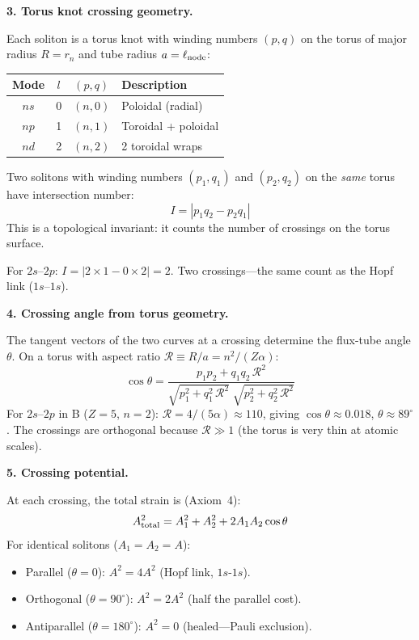 \noindent\textbf{3. Torus knot crossing geometry.}

Each soliton is a torus knot with winding
numbers $(p, q)$ on the torus of major radius
$R = r_n$ and tube radius $a = \ell_{\rm node}$:
\begin{center}
\small
\renewcommand{\arraystretch}{1.2}
\begin{tabular}{c c c l}
\toprule
\textbf{Mode} & $l$ & $(p, q)$ &
\textbf{Description} \\
\midrule
$ns$ & 0 & $(n, 0)$ & Poloidal (radial) \\
$np$ & 1 & $(n, 1)$ & Toroidal + poloidal \\
$nd$ & 2 & $(n, 2)$ & 2 toroidal wraps \\
\bottomrule
\end{tabular}
\end{center}

Two solitons with winding numbers
$(p_1, q_1)$ and $(p_2, q_2)$ on the \emph{same}
torus have intersection number:
\begin{equation}
    I = |p_1 q_2 - p_2 q_1|
    \label{eq:intersection_number}
\end{equation}
This is a topological invariant: it counts
the number of crossings on the torus surface.

For $2s$--$2p$:
$I = |2 \times 1 - 0 \times 2| = 2$.
Two crossings---the same count as the
Hopf link ($1s$--$1s$).

\noindent\textbf{4. Crossing angle from torus
geometry.}

The tangent vectors of the two curves at
a crossing determine the flux-tube angle
$\theta$.  On a torus with aspect ratio
$\mathcal{R} \equiv R/a = n^2/(Z\alpha)$:
\begin{equation}
    \cos\theta = \frac{p_1 p_2 + q_1 q_2\,
    \mathcal{R}^2}{\sqrt{p_1^2 + q_1^2\,
    \mathcal{R}^2}\;\sqrt{p_2^2 + q_2^2\,
    \mathcal{R}^2}}
    \label{eq:crossing_angle}
\end{equation}
For $2s$--$2p$ in B ($Z = 5$, $n = 2$):
$\mathcal{R} = 4/(5\alpha) \approx 110$,
giving $\cos\theta \approx 0.018$,
$\theta \approx 89^\circ$.  The crossings
are orthogonal because $\mathcal{R} \gg 1$
(the torus is very thin at atomic scales).

\noindent\textbf{5. Crossing potential.}

At each crossing, the total strain is
(Axiom~4):
\begin{equation}
    A_{\rm total}^2 = A_1^2 + A_2^2
    + 2 A_1 A_2 \cos\theta
\end{equation}
For identical solitons ($A_1 = A_2 = A$):
\begin{itemize}
    \item Parallel ($\theta = 0$):
          $A^2 = 4A^2$ (Hopf link, $1s$-$1s$).
    \item Orthogonal ($\theta = 90^\circ$):
          $A^2 = 2A^2$ (half the parallel cost).
    \item Antiparallel ($\theta = 180^\circ$):
          $A^2 = 0$ (healed---Pauli exclusion).
\end{itemize}

